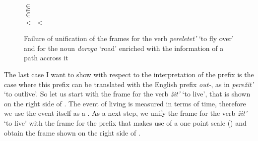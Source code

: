 \begin{figure}
\small
\begin{minipage}{0.7\textwidth}\centering
{}
\end{minipage}
\begin{minipage}{0.25\textwidth}\centering
{}\\
 $\in$ \\
 $\in$ \\
 $\in$ \\
 $<$  $<$ 
\end{minipage}
\caption{Failure of unification of the frames for the verb \textit{pereletet'} `to fly over' and for the noun \textit{doroga} `road' enriched with the information of a path accross it  \label{frame:pere:letet:road:red}}
\end{figure}

The last case I want to show with respect to the  interpretation of the prefix  is the case where this prefix can be translated with the English prefix \textit{out-}, as in \textit{pere\v{z}it'} `to outlive'. So let us start with the frame for the verb \textit{\v{z}it'} `to live', that is shown on the right side of . The event of living is measured in terms of time, therefore we use the event itself as a . As a next step, we unify the frame for the verb \textit{\v{z}it'} `to live' with the frame for the prefix  that makes use of a one point scale () and obtain the frame shown on the right side of .


